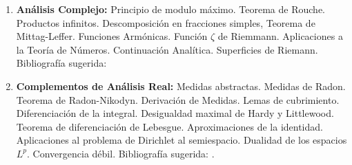 \documentclass[10pt,a4paper]{article}
\begin{document}
\begin{enumerate}
\item \textbf{Análisis Complejo:} Principio de modulo máximo. Teorema de
Rouche. Productos infinitos. Descomposición en fracciones simples,
Teorema de Mittag-Leffer. Funciones Armónicas. Función $\zeta$ de
Riemmann. Aplicaciones a la Teoría de Números. Continuación
Analítica. Superficies de Riemann. Bibliografía sugerida:
\cite{ahlfors,conway}

\item\textbf{Complementos de Análisis Real:} Medidas abstractas. Medidas de
Radon. Teorema de Radon-Nikodyn. Derivación de Medidas. Lemas de
cubrimiento. Diferenciación de la integral. Desigualdad maximal de
Hardy y Littlewood. Teorema de diferenciación de Lebesgue.
Aproximaciones de la identidad. Aplicaciones al problema de
Dirichlet al semiespacio. Dualidad de los espacios $L^p$.
Convergencia débil. Biblio\-grafía sugerida:
\cite{evansgariepy,favazo,rudin}.

\end{enumerate}
\end{document}
